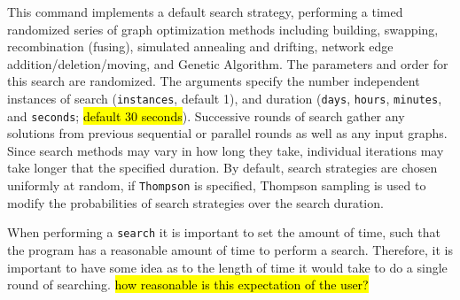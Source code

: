 	\begin{phygdescription}
		{This command implements a default search strategy, performing a timed randomized 
		series of graph optimization methods including building, swapping, recombination (fusing), 
		simulated annealing and drifting, network edge addition/deletion/moving, and Genetic 
		Algorithm. The parameters and order for this search are randomized. The arguments 
		specify the number independent instances of search (\texttt{instances}, default 1), and duration 
		(\texttt{days}, \texttt{hours}, \texttt{minutes}, and \texttt{seconds}; 
		\hl{default 30 seconds}). Successive rounds of search gather 
		any solutions from previous sequential or parallel rounds as well as any input graphs.
		Since search methods may vary in how long they take, individual iterations may take 
		longer that the specified duration.  By default, search strategies are chosen uniformly at random, 
		if \texttt{Thompson} is specified, Thompson sampling \cite{Thompson1933,WheelerThompson} 
		is used to modify the probabilities of search strategies over the search duration.
		
		When performing a \texttt{search} it is important to set the amount of time, such that the 
		program has a reasonable amount of time to perform a search. Therefore, it is important
		to have some idea as to the length of time it would take to do a single round of searching.
		\hl{how reasonable is this expectation of the user?}}
	\end{phygdescription}
			
